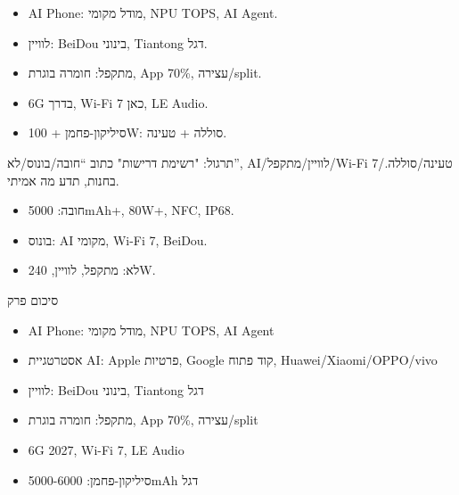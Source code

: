 
\begin{itemize}
  \item AI Phone: מודל מקומי, NPU TOPS, AI Agent.
  \item לוויין: BeiDou בינוני, Tiantong דגל.
  \item מתקפל: חומרה בוגרת, App 70\%, עצירה/split.
  \item 6G בדרך, Wi-Fi 7 כאן, LE Audio.
  \item סיליקון-פחמן + 100W: סוללה + טעינה.
\end{itemize}

\begin{tcbpractice}{תרגול: "רשימת דרישות"}
כתוב “חובה/בונוס/לא”, AI/לוויין/מתקפל/Wi-Fi 7/טעינה/סוללה. בחנות, תדע מה אמיתי.

\begin{itemize}
  \item חובה: 5000mAh+, 80W+, NFC, IP68.
  \item בונוס: AI מקומי, Wi-Fi 7, BeiDou.
  \item לא: מתקפל, לוויין, 240W.
\end{itemize}

\end{tcbpractice}

\begin{tcbsummary}{סיכום פרק}
\begin{itemize}
  \item AI Phone: מודל מקומי, NPU TOPS, AI Agent
  \item אסטרטגיית AI: Apple פרטיות, Google קוד פתוח, Huawei/Xiaomi/OPPO/vivo
  \item לוויין: BeiDou בינוני, Tiantong דגל
  \item מתקפל: חומרה בוגרת, App 70\%, עצירה/split
  \item 6G 2027, Wi-Fi 7, LE Audio
  \item סיליקון-פחמן: 5000-6000mAh דגל
\end{itemize}

\end{tcbsummary}
